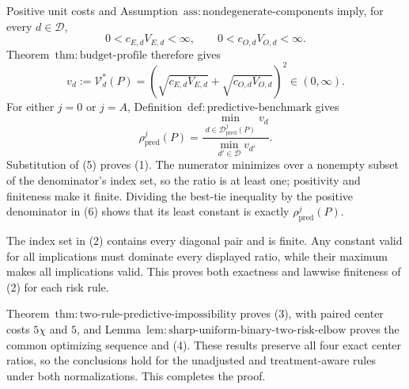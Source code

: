 Positive unit costs and Assumption~\(\mathrm{ass{:}nondegenerate\text{-}components}\) imply, for every \(d\in\mathcal D\),
\[
 0<c_{E,d}V_{E,d}<\infty,
 \qquad 0<c_{O,d}V_{O,d}<\infty.
\]
Theorem~\(\mathrm{thm{:}budget\text{-}profile}\) therefore gives
\[
 v_d:=\mathcal V_d^*(P)
 =(\sqrt{c_{E,d}V_{E,d}}+\sqrt{c_{O,d}V_{O,d}})^2\in(0,\infty).               \tag{5}
\]
For either \(j=0\) or \(j=A\), Definition~\(\mathrm{def{:}predictive\text{-}benchmark}\) gives
\[
 \rho_{\mathrm{pred}}^j(P)
 =\frac{\min_{d\in\mathcal D_{\mathrm{pred}}^j(P)}v_d}
 {\min_{d'\in\mathcal D}v_{d'}}.                                             \tag{6}
\]
Substitution of (5) proves (1).  The numerator minimizes over a nonempty subset of the denominator's index set, so the ratio is at least one; positivity and finiteness make it finite.  Dividing the best-tie inequality by the positive denominator in (6) shows that its least constant is exactly \(\rho_{\mathrm{pred}}^j(P)\).

The index set in (2) contains every diagonal pair and is finite.  Any constant valid for all implications must dominate every displayed ratio, while their maximum makes all implications valid.  This proves both exactness and lawwise finiteness of (2) for each risk rule.

Theorem~\(\mathrm{thm{:}two\text{-}rule\text{-}predictive\text{-}impossibility}\) proves (3), with paired center costs \(5\chi\) and \(5\), and Lemma~\(\mathrm{lem{:}sharp\text{-}uniform\text{-}binary\text{-}two\text{-}risk\text{-}elbow}\) proves the common optimizing sequence and (4).  These results preserve all four exact center ratios, so the conclusions hold for the unadjusted and treatment-aware rules under both normalizations.  This completes the proof.